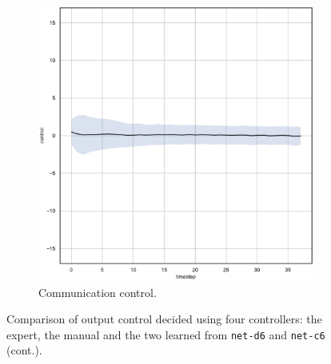 \begin{figure}[!htb]
\begin{center}
\begin{subfigure}[h]{0.35\textwidth}
			\includegraphics[width=\textwidth]{contents/images/net-c6/control-overtime-learned_communication}
			\caption{Communication control.}
		\end{subfigure}
	\end{center}
	\vspace{-0.5cm}
	\caption{Comparison of output control decided using four controllers: the 
	expert, the manual and the two learned from \texttt{net-d6} and 
	\texttt{net-c6} (cont.).}
	\label{fig:net-c6control}
\end{figure}

